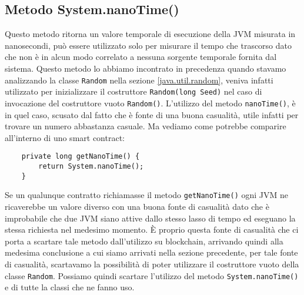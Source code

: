 		\subsection{Metodo System.nanoTime()}
			Questo metodo ritorna un valore temporale di esecuzione della JVM misurata in nanosecondi, può essere utilizzato solo per misurare il tempo che trascorso dato che non è in alcun modo correlato a nessuna sorgente temporale fornita dal sistema. 
			Questo metodo lo abbiamo incontrato in precedenza quando stavamo analizzando la classe \lstinline|Random| nella sezione \ref{java.util.random}, veniva infatti utilizzato per inizializzare il costruttore \lstinline|Random(long Seed)| nel caso di invocazione del costruttore vuoto \lstinline|Random()|. L'utilizzo del metodo \lstinline|nanoTime()|, è in quel caso, scusato dal fatto che è fonte di una buona casualità, utile infatti per trovare un numero abbastanza casuale. Ma vediamo come potrebbe comparire all'interno di uno smart contract:
			\begin{lstlisting}
	private long getNanoTime() {
		return System.nanoTime();
	}
			\end{lstlisting}
			Se un qualunque contratto richiamasse il metodo \lstinline|getNanoTime()| ogni JVM ne ricaverebbe un valore diverso con una buona fonte di casualità dato che è improbabile che due JVM siano attive dallo stesso lasso di tempo ed eseguano la stessa richiesta nel medesimo momento. \`E proprio questa fonte di casualità che ci porta a scartare tale metodo dall'utilizzo su blockchain, arrivando quindi alla medesima conclusione a cui siamo arrivati nella sezione precedente, per tale fonte di casualità, scartavamo la possibilità di poter utilizzare il costruttore vuoto della classe \lstinline|Random|. Possiamo quindi scartare l'utilizzo del metodo \lstinline|System.nanoTime()| e di tutte la classi che ne fanno uso.
